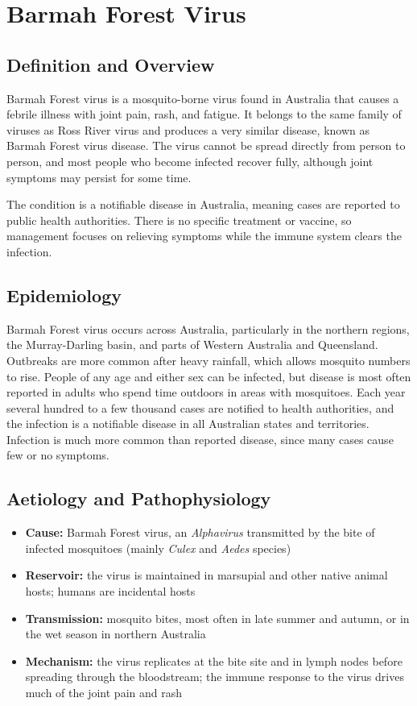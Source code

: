 \chapter{Barmah Forest Virus}

\section*{Definition and Overview}
Barmah Forest virus is a mosquito-borne virus found in Australia that causes a febrile illness with joint pain, rash, and fatigue. It belongs to the same family of viruses as Ross River virus and produces a very similar disease, known as Barmah Forest virus disease. The virus cannot be spread directly from person to person, and most people who become infected recover fully, although joint symptoms may persist for some time.

The condition is a notifiable disease in Australia, meaning cases are reported to public health authorities. There is no specific treatment or vaccine, so management focuses on relieving symptoms while the immune system clears the infection.

\section*{Epidemiology}
Barmah Forest virus occurs across Australia, particularly in the northern regions, the Murray-Darling basin, and parts of Western Australia and Queensland. Outbreaks are more common after heavy rainfall, which allows mosquito numbers to rise. People of any age and either sex can be infected, but disease is most often reported in adults who spend time outdoors in areas with mosquitoes. Each year several hundred to a few thousand cases are notified to health authorities, and the infection is a notifiable disease in all Australian states and territories. Infection is much more common than reported disease, since many cases cause few or no symptoms.

\section*{Aetiology and Pathophysiology}
\begin{itemize}
    \item \textbf{Cause:} Barmah Forest virus, an \textit{Alphavirus} transmitted by the bite of infected mosquitoes (mainly \textit{Culex} and \textit{Aedes} species)
    \item \textbf{Reservoir:} the virus is maintained in marsupial and other native animal hosts; humans are incidental hosts
    \item \textbf{Transmission:} mosquito bites, most often in late summer and autumn, or in the wet season in northern Australia
    \item \textbf{Mechanism:} the virus replicates at the bite site and in lymph nodes before spreading through the bloodstream; the immune response to the virus drives much of the joint pain and rash
\end{itemize}

